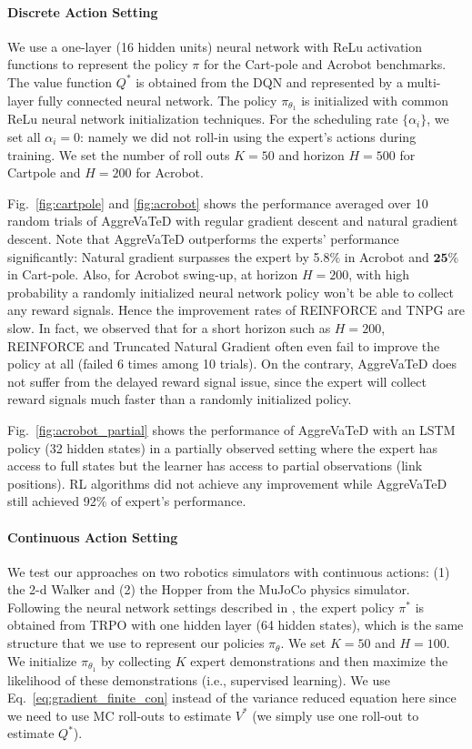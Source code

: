 \documentclass{article}
\begin{document}
\paragraph{Discrete Action Setting} We use a one-layer (16 hidden units) neural network with ReLu activation functions to represent the policy $\pi$ for the Cart-pole and Acrobot benchmarks. The value function $Q^*$ is obtained from the DQN \cite{mnih2015human} and represented by a multi-layer fully connected neural network. The policy $\pi_{\theta_1}$ is initialized with common ReLu neural network initialization techniques. For the scheduling rate $\{\alpha_i\}$, we set all $\alpha_i = 0$: namely we did not roll-in using the expert's actions during training.  We set the number of roll outs $K = 50$ and horizon $H = 500$ for Cartpole and $H = 200$ for Acrobot.



Fig.~\ref{fig:cartpole} and \ref{fig:acrobot} shows the performance averaged over 10 random trials of AggreVaTeD with regular gradient descent and natural gradient descent. Note that AggreVaTeD outperforms the experts' performance significantly: Natural gradient surpasses the expert by 5.8$\%$ in Acrobot and $\mathbf{25\%}$ in Cart-pole. Also, for Acrobot swing-up, at horizon $H=200$, with high probability a randomly initialized neural network policy won't be able to collect any reward signals. Hence the improvement rates of REINFORCE and TNPG are slow. In fact, we observed that for a short horizon such as $H=200$, REINFORCE and Truncated Natural Gradient often even fail to improve the policy at all (failed 6 times among 10 trials). On the contrary, AggreVaTeD does not suffer from the delayed reward signal issue, since the expert will collect reward signals much faster than a randomly initialized policy. 

Fig.~\ref{fig:acrobot_partial} shows the performance of AggreVaTeD with an LSTM policy (32 hidden states) in a partially observed setting where the expert has access to full states but the learner has access to partial observations (link positions). RL algorithms did not achieve any improvement while AggreVaTeD still achieved 92$\%$ of expert's performance.

\vspace{-5pt}
\paragraph{Continuous Action Setting}
We test our approaches on two robotics simulators with continuous actions: (1) the 2-d Walker and (2) the Hopper from the MuJoCo physics simulator. Following the neural network settings described in \citet{schulman2015trust}, the expert policy $\pi^*$ is obtained from TRPO with one hidden layer (64 hidden states), which is the same structure that we use to represent our policies $\pi_{\theta}$. We set $K = 50$ and $H = 100$. We initialize $\pi_{\theta_1}$ by collecting $K$ expert demonstrations and then maximize the likelihood of these demonstrations (i.e., supervised learning). We use Eq.~\ref{eq:gradient_finite_con} instead of the variance reduced equation here since we need to use MC roll-outs to estimate $V^*$ (we simply use one roll-out to estimate $Q^*$). %
\end{document}

